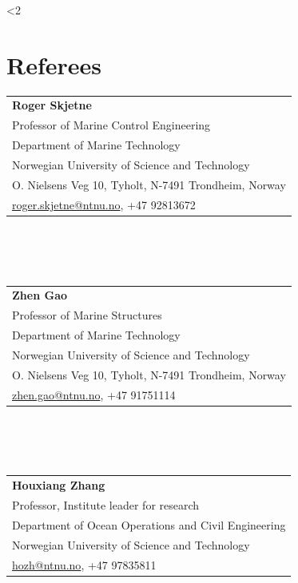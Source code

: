 \documentclass[10pt]{ctexart}
\begin{document}
\newpage
\ifnum\value{num}<2 {
    \section*{\textbf{Referees}}\vspace{-1.5em}
    	\begin{tabular}{@{}l@{}}
    	\textbf{Roger Skjetne}\\
    	Professor of Marine Control Engineering\\
    	Department of Marine Technology\\
        Norwegian University of Science and Technology\\
        O. Nielsens Veg 10, Tyholt, N-7491 Trondheim, Norway \\
        \url{roger.skjetne@ntnu.no}, +47 92813672
        \end{tabular}\\
        \\ \\
        \begin{tabular}{@{}l@{}}
        \textbf{Zhen Gao}\\
        Professor of Marine Structures\\
    	Department of Marine Technology\\
        Norwegian University of Science and Technology\\
        O. Nielsens Veg 10, Tyholt, N-7491 Trondheim, Norway\\
        \url{zhen.gao@ntnu.no}, +47 91751114
        \end{tabular}\\
      \\ \\
      \begin{tabular}{@{}l@{}}
        \textbf{Houxiang Zhang}\\
        Professor, Institute leader for research\\
    	Department of Ocean Operations and Civil Engineering\\
        Norwegian University of Science and Technology\\
        \url{hozh@ntnu.no}, +47 97835811
        \end{tabular}\\
        \\ \\ 
}
\end{document}
